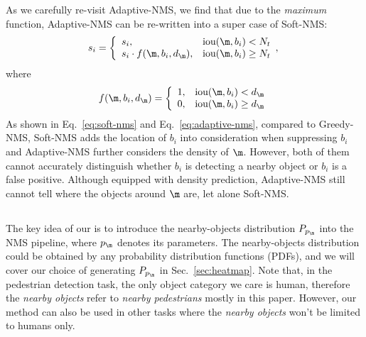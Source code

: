 \documentclass[sigconf]{acmart}
\begin{document}
As we carefully re-visit Adaptive-NMS, we find that due to the \textit{maximum} function, Adaptive-NMS can be re-written into a super case of Soft-NMS:
\begin{equation}
    s_i=\left\{
        \begin{array}{ll}
            s_i,
            &\text{iou}(\m, b_i) < N_t 
            \\
            s_i \cdot f(\m, b_i, d_\m),
            &\text{iou}(\m, b_i) \geq N_t
        \end{array}
        ,
        \right.
    \label{eq:adaptive-nms}
\end{equation} where
\begin{equation}
    f(\m, b_i, d_\m)=\left\{
        \begin{array}{ll}
            1,
            &\text{iou}(\m, b_i) < d_\m
            \\
            0,
            &\text{iou}(\m, b_i) \geq d_\m
        \end{array}
        \right.
    \label{eq:adaptive-nms-f}
\end{equation} 
As shown in Eq.~\ref{eq:soft-nms} and Eq.~\ref{eq:adaptive-nms}, compared to Greedy-NMS, Soft-NMS adds the location of $b_i$ into consideration when suppressing $b_i$ and Adaptive-NMS further considers the density of $\m$. However, both of them cannot accurately distinguish whether $b_i$ is detecting a nearby object or $b_i$ is a false positive. Although equipped with density prediction, Adaptive-NMS still cannot tell where the objects around $\m$ are, let alone Soft-NMS.

\subsection{\nmsname{}}
\label{sec:nms}
The key idea of our \nmsname{} is to introduce the nearby-objects distribution $P_{p_\m}$ into the NMS pipeline, where $p_\m$ denotes its parameters. The nearby-objects distribution could be obtained by any probability distribution functions (PDFs), and we will cover our choice of generating $P_{p_\m}$ in Sec.~\ref{sec:heatmap}. Note that, in the pedestrian detection task, the only object category we care is human, therefore the \textit{nearby objects} refer to \textit{nearby pedestrians} mostly in this paper. However, our method can also be used in other tasks where the \textit{nearby objects} won't be limited to humans only.
\end{document}
